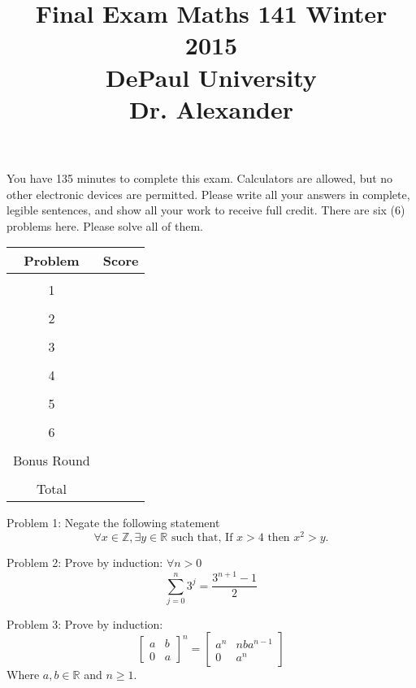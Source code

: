 \documentclass[16 pt]{amsart}
\theoremstyle{definition}
\theoremstyle{remark}
\numberwithin{equation}{subsection}
\newcommand{\R}{\mathbb{R}}
\newcommand{\Z}{\mathbb{Z}}
\begin{document}
\title{Final Exam Maths 141 Winter 2015 \\ DePaul University\\Dr. Alexander}
\maketitle
You have 135 minutes to complete this exam.  Calculators are allowed, but no other electronic devices are permitted.  Please write all your answers in complete, legible sentences, and show all your work to receive full credit.  There are six (6) problems here.  Please solve all of them.  
\vspace{1in}


\begin{center}
  \begin{tabular}{ c | c }
    Problem & Score\\
    \hline
    &\\
    1&\\
    &\\
    2&\\
    &\\
    3&\\
    &\\
    4&\\
    &\\
    5&\\
    &\\
    6&\\
    &\\
    Bonus Round 
    &\\
    \hline 
    &\\    
    Total & 
 \end{tabular}
\end{center}


\newpage


Problem 1: Negate the following statement
\[
\forall x\in \Z, \exists y\in\R \text{ such that, If } x > 4 \text{ then } x^2 > y.
\]

 
\newpage


Problem 2: Prove by induction:  $\forall n>0$
\[
\sum_{j=0}^{n} 3^j = \frac{3^{n+1}-1}{2}
\]

\newpage

Problem 3: Prove by induction:
\[
\begin{bmatrix}
a & b \\
0 & a
\end{bmatrix}^n = 
\begin{bmatrix}
a^n & nba^{n-1} \\
0 & a^n
\end{bmatrix}
\]
Where $a,b\in \R$ and $n\ge 1$.
\end{document}
